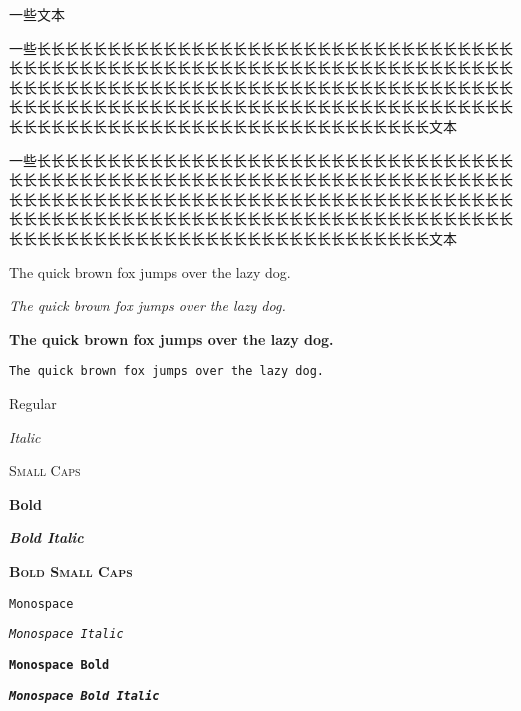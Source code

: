 \begin{frame}{}

	一些文本

	一些长长长长长长长长长长长长长长长长长长长长长长长长长长长长长长长长长长长长长长长长长长长长长长长长长长长长长长长长长长长长长长长长长长长长长长长长长长长长长长长长长长长长长长长长长长长长长长长长长长长长长长长长长长长长长长长长长长长长长长长长长长长长长长长长长长长长长长长长长长长长长长长长长长长长长长长长长长长长长长长长长长长长长长长长长长长长文本

	一些长长长长长长长长长长长长长长长长长长长长长长长长长长长长长长长长长长长长长长长长长长长长长长长长长长长长长长长长长长长长长长长长长长长长长长长长长长长长长长长长长长长长长长长长长长长长长长长长长长长长长长长长长长长长长长长长长长长长长长长长长长长长长长长长长长长长长长长长长长长长长长长长长长长长长长长长长长长长长长长长长长长长长长长长长长长长文本

	The quick brown fox jumps over the lazy dog.

	\textit{The quick brown fox jumps over the lazy dog.}

	\textbf{The quick brown fox jumps over the lazy dog.}

	\texttt{The quick brown fox jumps over the lazy dog.}

	Regular

	\textit{Italic}

	\textsc{Small Caps}

	\textbf{Bold}

	\textbf{\textit{Bold Italic}}

	\textbf{\textsc{Bold Small Caps}}

	\texttt{Monospace}

	\texttt{\textit{Monospace Italic}}

	\texttt{\textbf{Monospace Bold}}

	\texttt{\textbf{\textit{Monospace Bold Italic}}}

\end{frame}
